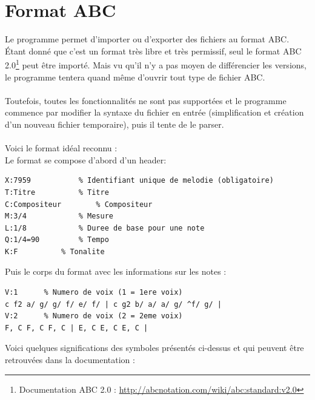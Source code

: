\documentclass[12pt]{report}
\begin{document}
\section{Format ABC}
Le programme permet d'importer ou d'exporter des fichiers au format ABC. Étant donné que c'est un format très libre et très permissif, 
seul le format ABC 2.0\footnote{Documentation ABC 2.0 : \url{http://abcnotation.com/wiki/abc:standard:v2.0}} peut être importé. Mais vu qu'il n'y a pas moyen de différencier les versions,
le programme tentera quand même d'ouvrir tout type de fichier ABC.\\ \\
Toutefois, toutes les fonctionnalités ne sont pas supportées et le programme commence par modifier la syntaxe du fichier en entrée (simplification et création d'un nouveau fichier temporaire),
puis il tente de le parser.\\\\
Voici le format idéal reconnu :\\\vskip 0.3in
Le format se compose d'abord d'un header: \\
\begin{lstlisting}[language=Tex]
X:7959		     % Identifiant unique de melodie (obligatoire)
T:Titre		     % Titre
C:Compositeur	     % Compositeur
M:3/4		     % Mesure
L:1/8		     % Duree de base pour une note
Q:1/4=90 	     % Tempo
K:F		     % Tonalite
\end{lstlisting}\vskip 0.3in
Puis le corps du format avec les informations sur les notes :\\
\begin{lstlisting}[language=Tex]
V:1	  	 % Numero de voix (1 = 1ere voix)
c f2 a/ g/ g/ f/ e/ f/ | c g2 b/ a/ a/ g/ ^f/ g/ |
V:2		 % Numero de voix (2 = 2eme voix)
F, C F, C F, C | E, C E, C E, C |
\end{lstlisting}
\vskip 0.6in
\newpage
Voici quelques significations des symboles présentés ci-dessus et qui peuvent être retrouvées dans la documentation :

\def\arraystretch{1.5}
\end{document}
